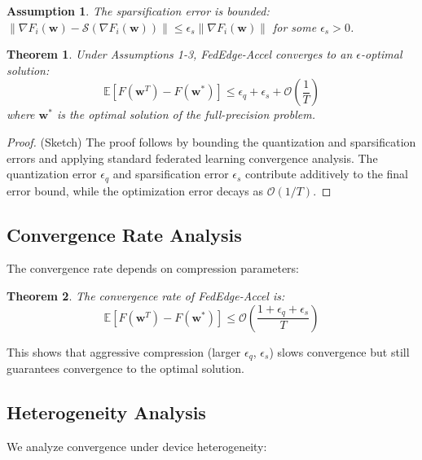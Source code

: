 \documentclass[journal]{IEEEtran}
\newtheorem{theorem}{Theorem}
\newtheorem{assumption}{Assumption}
\begin{document}
\begin{assumption}
The sparsification error is bounded: $\|\nabla F_i(\mathbf{w}) - \mathcal{S}(\nabla F_i(\mathbf{w}))\| \leq \epsilon_s \|\nabla F_i(\mathbf{w})\|$ for some $\epsilon_s > 0$.
\end{assumption}

\begin{theorem}
Under Assumptions 1-3, FedEdge-Accel converges to an $\epsilon$-optimal solution:
\begin{equation}
\mathbb{E}[F(\mathbf{w}^T) - F(\mathbf{w}^*)] \leq \epsilon_q + \epsilon_s + \mathcal{O}\left(\frac{1}{T}\right)
\label{eq:convergence}
\end{equation}
where $\mathbf{w}^*$ is the optimal solution of the full-precision problem.
\end{theorem}

\begin{proof}
(Sketch) The proof follows by bounding the quantization and sparsification errors and applying standard federated learning convergence analysis. The quantization error $\epsilon_q$ and sparsification error $\epsilon_s$ contribute additively to the final error bound, while the optimization error decays as $\mathcal{O}(1/T)$.
\end{proof}

\subsection{Convergence Rate Analysis}

The convergence rate depends on compression parameters:

\begin{theorem}
The convergence rate of FedEdge-Accel is:
\begin{equation}
\mathbb{E}[F(\mathbf{w}^T) - F(\mathbf{w}^*)] \leq \mathcal{O}\left(\frac{1 + \epsilon_q + \epsilon_s}{T}\right)
\label{eq:convergence_rate}
\end{equation}
\end{theorem}

This shows that aggressive compression (larger $\epsilon_q$, $\epsilon_s$) slows convergence but still guarantees convergence to the optimal solution.

\subsection{Heterogeneity Analysis}

We analyze convergence under device heterogeneity:
\end{document}
